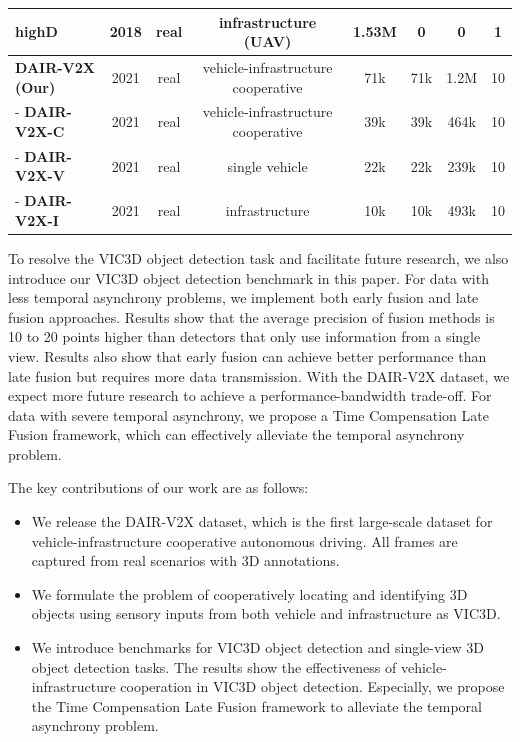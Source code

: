 \begin{table}[ht]
{\begin{tabular}{lccccccc}
\hline
highD\cite{krajewski2018highd}         & 2018 & real      & infrastructure (UAV)                                  & 1.53M & 0 & 0   & 1  \\
\hline
\hline
\textbf{DAIR-V2X (Our)}      & 2021 & real      & vehicle-infrastructure cooperative & 71k & 71k & 1.2M & 10   \\
\hline
 - \textbf{ DAIR-V2X-C}    & 2021 & real      & vehicle-infrastructure cooperative & 39k & 39k & 464k & 10 \\
\hline
 - \textbf{ DAIR-V2X-V}    & 2021 & real      & single vehicle                       & 22k & 22k & 239k & 10  \\
\hline
 - \textbf{ DAIR-V2X-I}    & 2021 & real      & infrastructure               & 10k & 10k & 493k & 10   \\
\hline
\hline
\end{tabular}%
}
\end{table}

 

To resolve the VIC3D object detection task and facilitate future research, we also introduce our VIC3D object detection benchmark in this paper.
For data with less temporal asynchrony problems, we implement both early fusion and late fusion approaches. Results show that the average precision of fusion methods is 10 to 20 points higher than detectors that only use information from a single view. 
Results also show that early fusion can achieve better performance than late fusion but requires more data transmission. With the DAIR-V2X dataset, we expect more future research to achieve a performance-bandwidth trade-off.
For data with severe temporal asynchrony, we propose a Time Compensation Late Fusion framework, which can effectively alleviate the temporal asynchrony problem.

The key contributions of our work are as follows:
\begin{itemize}
    \item We release the DAIR-V2X dataset, which is the first large-scale dataset for vehicle-infrastructure cooperative autonomous driving. All frames are captured from real scenarios with 3D annotations.
    \item We formulate the problem of cooperatively locating and identifying 3D objects using sensory inputs from both vehicle and infrastructure as VIC3D.
    \item We introduce benchmarks for VIC3D object detection and single-view 3D object detection tasks.
    The results show the effectiveness of vehicle-infrastructure cooperation in VIC3D object detection.
    Especially, we propose the Time Compensation Late Fusion framework to alleviate the temporal asynchrony problem. 
\end{itemize}